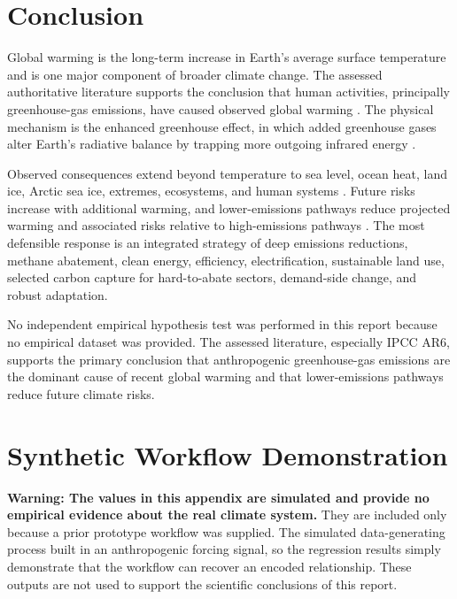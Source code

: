 \documentclass[12pt]{article}
\begin{document}
\section{Conclusion}

Global warming is the long-term increase in Earth's average surface temperature and is one major component of broader climate change. The assessed authoritative literature supports the conclusion that human activities, principally greenhouse-gas emissions, have caused observed global warming \cite{ref1}. The physical mechanism is the enhanced greenhouse effect, in which added greenhouse gases alter Earth's radiative balance by trapping more outgoing infrared energy \cite{ref3,ref4,ref5}.

Observed consequences extend beyond temperature to sea level, ocean heat, land ice, Arctic sea ice, extremes, ecosystems, and human systems \cite{ref1,ref6}. Future risks increase with additional warming, and lower-emissions pathways reduce projected warming and associated risks relative to high-emissions pathways \cite{ref1,ref7}. The most defensible response is an integrated strategy of deep emissions reductions, methane abatement, clean energy, efficiency, electrification, sustainable land use, selected carbon capture for hard-to-abate sectors, demand-side change, and robust adaptation.

No independent empirical hypothesis test was performed in this report because no empirical dataset was provided. The assessed literature, especially IPCC AR6, supports the primary conclusion that anthropogenic greenhouse-gas emissions are the dominant cause of recent global warming and that lower-emissions pathways reduce future climate risks.

\appendix
\section{Synthetic Workflow Demonstration}

\textbf{Warning: The values in this appendix are simulated and provide no empirical evidence about the real climate system.} They are included only because a prior prototype workflow was supplied. The simulated data-generating process built in an anthropogenic forcing signal, so the regression results simply demonstrate that the workflow can recover an encoded relationship. These outputs are not used to support the scientific conclusions of this report.
\end{document}
